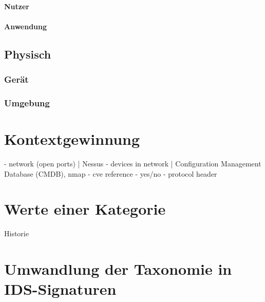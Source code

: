 \paragraph{Nutzer}
\paragraph{Anwendung}

\subsection{Physisch}
\subsubsection{Gerät}
\subsubsection{Umgebung}

\section{Kontextgewinnung}
- network (open ports) | Nessus
- devices in network | Configuration Management Database (CMDB), nmap   
- cve reference - yes/no
- protocol header
\section{Werte einer Kategorie}


Historie

\section{Umwandlung der Taxonomie in IDS-Signaturen} 

